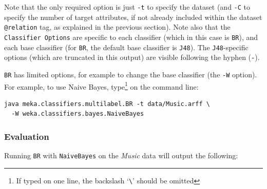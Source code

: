 \documentclass[11pt]{article}
\begin{document}
\begin{center}

\end{center}

Note that the only required option is just \texttt{-t} to specify the dataset (and \texttt{-C} to specify the number of target attributes, if not already included within the dataset \texttt{@relation} tag, as explained in the previous section). Note also that the \texttt{Classifier Options} are specific to each classifier (which in this case is \texttt{BR}), and each base classifier (for \texttt{BR}, the default base classifier is \texttt{J48}). The \texttt{J48}-specific options (which are truncated in this output) are visible following the hyphen (\texttt{-}). 

\texttt{BR} has limited options, for example to change the base classifier (the \texttt{-W} option). For example, to use Naive Bayes, type\footnote{If typed on one line, the backslash `\texttt{\textbackslash}' should be omitted} on the command line:

\begin{lstlisting}
java meka.classifiers.multilabel.BR -t data/Music.arff \
  -W weka.classifiers.bayes.NaiveBayes
\end{lstlisting}

\subsubsection{\label{sec:evaluation}Evaluation}

Running \texttt{BR} with \texttt{NaiveBayes} on the \textit{Music} data will output the following:

%
\begin{center}
%

\end{center}
\end{document}

